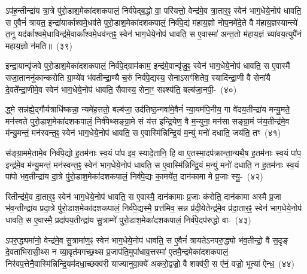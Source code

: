 ऽप॑ह॒न्तीन्द्रा॑य त्रा॒त्रे पु॑रो॒डाश॒मेका॑\-दश\-कपालं॒ निर्व॑पेद्ब॒द्धो वा॒ परि॑यत्तो॒ वेन्द्र॑मे॒व त्रा॒तार॒ꣴ॒ स्वेन॑ भाग॒\-धेये॒नोप॑ धावति॒ स ए॒वैनं॑ त्रायत॒ इन्द्रा॑यार्काश्वमे॒धव॑ते पुरो॒डाश॒मेका॑\-दश\-कपालं॒ निर्व॑पे॒द्यं म॑हाय॒ज्ञो नोप॒नमे॑दे॒ते वै म॑हाय॒ज्ञस्यान्त्ये॑ त॒नू यद॑र्काश्वमे॒धाविन्द्र॑मे॒वार्का᳚श्वमे॒धव॑न्त॒ꣴ॒ स्वेन॑ भाग॒\-धेये॒नोप॑ धावति॒ स ए॒वास्मा॑ अन्त॒तो म॑हाय॒ज्ञं च्या॑वय॒त्युपै॑नं महाय॒ज्ञो न॑मति॥~(३९)\ip

{\anuvakamend[{इ॒न्द्रि॒याव॑न्त॒ꣴ॒ स्वेन॑ भाग॒\-धेये॒नोप॑ धावति॒ सो᳚\-ऽर्कव॑न्त॒ꣴ॒ स्वेन॑ भाग॒\-धेये॑नै॒वेन्द्रा॑यास्मा॒न्मृधो᳚\-ऽस्मै स॒प्त च॑}]}

इन्द्रा॒यान्वृ॑जवे पुरो॒डाश॒मेका॑\-दश\-कपालं॒ निर्व॑पे॒द्ग्राम॑काम॒ इन्द्र॑मे॒वान्वृ॑जु॒ꣴ॒ स्वेन॑ भाग॒\-धेये॒नोप॑ धावति॒ स ए॒वास्मै॑ सजा॒ताननु॑कान्करोति ग्रा॒म्ये॑व भ॑वतीन्द्रा॒ण्यै च॒रुं निर्व॑पे॒द्यस्य॒ सेना\-ऽसꣳ॑शितेव॒ स्यादि॑न्द्रा॒णी वै सेना॑यै दे॒वते᳚न्द्रा॒णीमे॒व स्वेन॑ भाग॒\-धेये॒नोप॑ धावति॒ सैवास्य॒ सेना॒ꣳ॒ सꣴश्य॑ति॒ बल्ब॑जा॒नपी॒-~(४०)\ip

द्ध्मे सन्न॑ह्ये॒द्गौर्यत्राधि॑ष्कन्ना॒ न्यमे॑ह॒त्ततो॒ बल्ब॑जा॒ उद॑तिष्ठ॒न्गवा॑\-मे॒वैनं॑ न्या॒यम॑पि॒नीय॒ गा वे॑दय॒तीन्द्रा॑य मन्यु॒मते॒ मन॑स्वते पुरो॒डाश॒मेका॑\-दश\-कपालं॒ निर्व॑पेथ्सङ्ग्रा॒मे सं य॑त्त इन्द्रि॒येण॒ वै म॒न्युना॒ मन॑सा सङ्ग्रा॒मं ज॑य॒तीन्द्र॑मे॒व म॑न्यु॒मन्तं॒ मन॑स्वन्त॒ꣴ॒ स्वेन॑ भाग॒\-धेये॒नोप॑ धावति॒ स ए॒वास्मि॑न्निन्द्रि॒यं म॒न्युं मनो॑ दधाति॒ जय॑ति॒ तꣳ~(४१)\ip

स॑ङ्ग्रा॒ममे॒तामे॒व निर्व॑पे॒द्यो ह॒तम॑नाः स्व॒यं पा॑प इव॒ स्यादे॒तानि॒ हि वा ए॒तस्मा॒दप॑क्रान्ता॒न्यथै॒ष ह॒तम॑नाः स्व॒यं पा॑प॒ इन्द्र॑मे॒व म॑न्यु॒मन्तं॒ मन॑स्वन्त॒ꣴ॒ स्वेन॑ भाग॒\-धेये॒नोप॑ धावति॒ स ए॒वास्मि॑न्निन्द्रि॒यं म॒न्युं मनो॑ दधाति॒ न ह॒तम॑नाः स्व॒यं पा॑पो भव॒तीन्द्रा॑य दा॒त्रे पु॑रो॒डाश॒मेका॑\-दश\-कपालं॒ निर्व॑पे॒द्यः का॒मये॑त॒ दान॑कामा मे प्र॒जाः स्यु॒-~(४२)\ip

रितीन्द्र॑मे॒व दा॒तार॒ꣴ॒ स्वेन॑ भाग॒\-धेये॒नोप॑ धावति॒ स ए॒वास्मै॒ दान॑कामाः प्र॒जाः क॑रोति॒ दान॑कामा अस्मै प्र॒जा भ॑व॒न्तीन्द्रा॑य प्रदा॒त्रे पु॑रो॒डाश॒मेका॑\-दश\-कपालं॒ निर्व॑पे॒द्यस्मै॒ प्रत्त॑मिव॒ सन्न प्र॑दी॒येतेन्द्र॑मे॒व प्र॑दा॒तार॒ꣴ॒ स्वेन॑ भाग॒\-धेये॒नोप॑ धावति॒ स ए॒वास्मै॒ प्रदा॑पय॒तीन्द्रा॑य सु॒त्राम्णे॑ पुरो॒डाश॒मेका॑\-दश\-कपालं॒ निर्व॑पे॒दप॑रुद्धो वा-~(४३)\ip

ऽपरु॒द्ध्यमा॑नो॒ वेन्द्र॑मे॒व सु॒त्रामा॑ण॒ꣴ॒ स्वेन॑ भाग॒\-धेये॒नोप॑ धावति॒ स ए॒वैनं॑ त्रायते\-ऽनपरु॒द्ध्यो भ॑व॒तीन्द्रो॒ वै स॒दृङ् दे॒वता॑भिरासी॒थ्स न व्या॒वृत॑मगच्छ॒थ्स प्र॒जा\-प॑ति॒मुपा॑\-धाव॒त्तस्मा॑ ए॒तमै॒न्द्रमेका॑\-दश\-कपालं॒ निर॑वप॒त्तेनै॒वास्मि॑न्निन्द्रि॒य\-म॑दधा॒च्छक्व॑री याज्यानुवा॒क्ये॑ अकरो॒द्वज्रो॒ वै शक्व॑री॒ स ए॑नं॒ वज्रो॒ भूत्या॑ ऐन्ध॒~(४४)\ip

